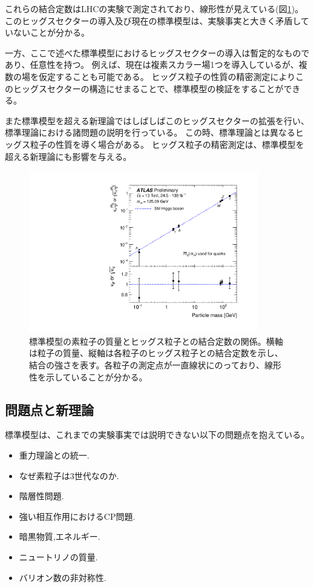 これらの結合定数はLHCの実験で測定されており、線形性が見えている(図\ref{kappa_vs_mass})。
このヒッグスセクターの導入及び現在の標準模型は、実験事実と大きく矛盾していないことが分かる。

一方、ここで述べた標準模型におけるヒッグスセクターの導入は暫定的なものであり、任意性を持つ。
例えば、現在は複素スカラー場1つを導入しているが、複数の場を仮定することも可能である。
ヒッグス粒子の性質の精密測定によりこのヒッグスセクターの構造にせまることで、標準模型の検証をすることができる。

また標準模型を超える新理論ではしばしばこのヒッグスセクターの拡張を行い、標準理論における諸問題の説明を行っている。
この時、標準理論とは異なるヒッグス粒子の性質を導く場合がある。
ヒッグス粒子の精密測定は、標準模型を超える新理論にも影響を与える。

\begin{figure}[bpt]\centering
\includegraphics[width=10cm,angle=270]{./kappa_vs_mass.pdf}
\caption[標準模型の素粒子の質量とヒッグス粒子との結合定数の関係]{標準模型の素粒子の質量とヒッグス粒子との結合定数の関係\cite{1-10}。横軸は粒子の質量、縦軸は各粒子のヒッグス粒子との結合定数を示し、結合の強さを表す。各粒子の測定点が一直線状にのっており、線形性を示していることが分かる。}
\label{kappa_vs_mass}
\end{figure}

\subsection{問題点と新理論}
標準模型は、これまでの実験事実では説明できない以下の問題点を抱えている。
\begin{itemize}
  \item 重力理論との統一.
  \item なぜ素粒子は3世代なのか.
  \item 階層性問題.
  \item 強い相互作用におけるCP問題.
  \item 暗黒物質,エネルギー.
  \item ニュートリノの質量.
  \item バリオン数の非対称性.
\end{itemize}

